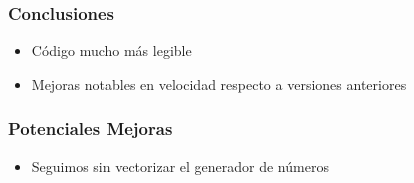 \documentclass{beamer}
\begin{document}
    \begin{frame}
        \frametitle{Conclusiones}
        \begin{itemize}
            \item Código mucho más legible
            \item Mejoras notables en velocidad respecto a versiones anteriores
        \end{itemize}
    \end{frame}

    \begin{frame}
        \frametitle{Potenciales Mejoras}
        \begin{itemize}
            \item Seguimos sin vectorizar el generador de números
        \end{itemize}
    \end{frame}
\end{document}

